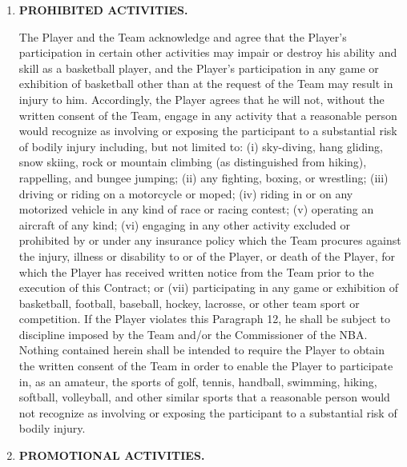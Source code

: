 \documentclass[
]{book}
\begin{document}
\begin{enumerate}
\def\labelenumi{\arabic{enumi}.}
\setcounter{enumi}{11}
\item
  \textbf{PROHIBITED ACTIVITIES.}

  The Player and the Team acknowledge and agree that the Player's participation in certain other activities may impair or destroy his ability and skill as a basketball player, and the Player's participation in any game or exhibition of basketball other than at the request of the Team may result in injury to him. Accordingly, the Player agrees that he will not, without the written consent of the Team, engage in any activity that a reasonable person would recognize as involving or exposing the participant to a substantial risk of bodily injury including, but not limited to: (i) sky-diving, hang gliding, snow skiing, rock or mountain climbing (as distinguished from hiking), rappelling, and bungee jumping; (ii) any fighting, boxing, or wrestling; (iii) driving or riding on a motorcycle or moped; (iv) riding in or on any motorized vehicle in any kind of race or racing contest; (v) operating an aircraft of any kind; (vi) engaging in any other activity excluded or prohibited by or under any insurance policy which the Team procures against the injury, illness or disability to or of the Player, or death of the Player, for which the Player has received written notice from the Team prior to the execution of this Contract; or (vii) participating in any game or exhibition of basketball, football, baseball, hockey, lacrosse, or other team sport or competition. If the Player violates this Paragraph 12, he shall be subject to discipline imposed by the Team and/or the Commissioner of the NBA. Nothing contained herein shall be intended to require the Player to obtain the written consent of the Team in order to enable the Player to participate in, as an amateur, the sports of golf, tennis, handball, swimming, hiking, softball, volleyball, and other similar sports that a reasonable person would not recognize as involving or exposing the participant to a substantial risk of bodily injury.
\item
  \textbf{PROMOTIONAL ACTIVITIES.}
\end{enumerate}
\end{document}
